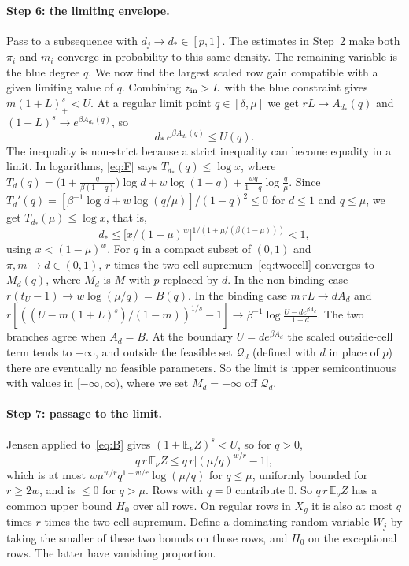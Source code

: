 \documentclass[11pt]{article}
\theoremstyle{definition}
\theoremstyle{remark}
\newcommand{\E}{\mathbb{E}}
\newcommand{\feas}{\mathcal Q}
\begin{document}
\paragraph{Step 6: the limiting envelope.} Pass to a subsequence with $d_j\to d_*\in[p,1]$.
The estimates in Step~2 make both $\pi_i$ and $m_i$ converge in probability to this same density.
The remaining variable is the blue degree $q$. We now find the largest scaled row gain compatible with a
given limiting value of $q$.
Combining
$z_{\rm in}>L$ with the blue constraint gives $m(1+L)_+^s<U$. At a regular limit point $q\in[\delta,\mu]$ we get
$rL\to A_{d_*}(q)$ and $(1+L)^s\to e^{\beta A_{d_*}(q)}$, so
\begin{equation}\label{eq:F}
d_*\,e^{\beta A_{d_*}(q)}\le U(q).
\end{equation}
The inequality is non-strict because a strict inequality can become equality in a limit.
In logarithms, \eqref{eq:F} says $T_{d_*}(q)\le\log x$, where
$T_d(q)=\big(1+\frac q{\beta(1-q)}\big)\log d+w\log(1-q)+\frac{wq}{1-q}\log\frac q\mu$. Since
$T_d'(q)=[\beta^{-1}\log d+w\log(q/\mu)]/(1-q)^2\le0$ for $d\le1$ and $q\le\mu$, we get $T_{d_*}(\mu)\le\log x$, that is,
\[
d_*\le\big[x/(1-\mu)^w\big]^{1/(1+\mu/(\beta(1-\mu)))}<1,
\]
using $x<(1-\mu)^w$. For $q$ in a compact subset of $(0,1)$ and $\pi,m\to d\in(0,1)$, $r$ times the two-cell
supremum~\eqref{eq:twocell} converges to $M_d(q)$, where $M_d$ is $M$ with $p$ replaced by $d$. In the non-binding case
$r(t_U-1)\to w\log(\mu/q)=B(q)$. In the binding case $m\,rL\to dA_d$ and
$r[((U-m(1+L)^s)/(1-m))^{1/s}-1]\to\beta^{-1}\log\frac{U-de^{\beta A_d}}{1-d}$. The two branches agree when $A_d=B$.
At the boundary $U=de^{\beta A_d}$ the scaled outside-cell term tends to $-\infty$, and outside the feasible set
$\feas_d$ (defined with $d$ in place of $p$) there are eventually no feasible parameters. So the limit is upper
semicontinuous with values in $[-\infty,\infty)$, where we set $M_d=-\infty$ off $\feas_d$.

\paragraph{Step 7: passage to the limit.} Jensen applied to~\eqref{eq:B} gives $(1+\E_\nu Z)^s<U$, so for $q>0$,
\[
q\,r\,\E_\nu Z\le q\,r\big[(\mu/q)^{w/r}-1\big],
\]
which is at most $w\mu^{w/r}q^{1-w/r}\log(\mu/q)$ for $q\le\mu$, uniformly bounded for $r\ge2w$, and is $\le0$ for
$q>\mu$. Rows with $q=0$ contribute $0$. So $q\,r\,\E_\nu Z$ has a common upper bound $H_0$ over all rows.
On regular rows in $X_g$ it is also at most $q$ times $r$ times the two-cell supremum.
Define a dominating random variable $W_j$ by taking the smaller of these two bounds on those rows, and $H_0$
on the exceptional rows. The latter have vanishing proportion.
\end{document}
